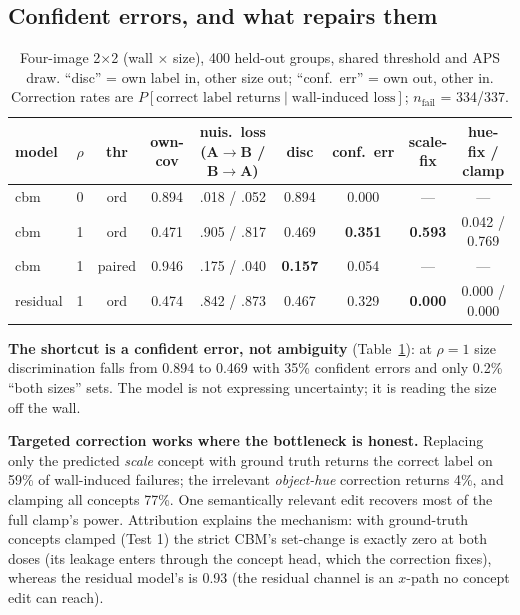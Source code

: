 \documentclass[11pt]{article}
\begin{document}
\subsection{Confident errors, and what repairs them}
\label{sec:results-repair}

\begin{table}[h]
\centering
\caption{Four-image 2$\times$2 (wall $\times$ size), 400 held-out groups,
shared threshold and APS draw. ``disc'' = own label in, other size out;
``conf.\ err'' = own out, other in. Correction rates are $P[\text{correct label
returns} \mid \text{wall-induced loss}]$; $n_{\text{fail}}$ = 334/337.}
\label{tab:fourimage}
\begin{tabular}{llccccccc}
\toprule
model & $\rho$ & thr & own-cov & nuis.\ loss (A$\to$B / B$\to$A) & disc & conf.\ err & scale-fix & hue-fix / clamp \\
\midrule
cbm & 0 & ord & 0.894 & .018 / .052 & 0.894 & 0.000 & --- & --- \\
cbm & 1 & ord & 0.471 & .905 / .817 & 0.469 & \textbf{0.351} & \textbf{0.593} & 0.042 / 0.769 \\
cbm & 1 & paired & 0.946 & .175 / .040 & \textbf{0.157} & 0.054 & --- & --- \\
residual & 1 & ord & 0.474 & .842 / .873 & 0.467 & 0.329 & \textbf{0.000} & 0.000 / 0.000 \\
\bottomrule
\end{tabular}
\end{table}

\textbf{The shortcut is a confident error, not ambiguity} (Table~\ref{tab:fourimage}):
at $\rho=1$ size discrimination falls from 0.894 to 0.469 with 35\% confident
errors and only 0.2\% ``both sizes'' sets. The model is not expressing
uncertainty; it is reading the size off the wall.

\textbf{Targeted correction works where the bottleneck is honest.} Replacing
only the predicted \emph{scale} concept with ground truth returns the correct
label on 59\% of wall-induced failures; the irrelevant \emph{object-hue}
correction returns 4\%, and clamping all concepts 77\%. One semantically
relevant edit recovers most of the full clamp's power. Attribution explains
the mechanism: with ground-truth concepts clamped (Test 1) the strict CBM's
set-change is exactly zero at both doses (its leakage enters through the
concept head, which the correction fixes), whereas the residual model's is
0.93 (the residual channel is an $x$-path no concept edit can reach).
\end{document}
